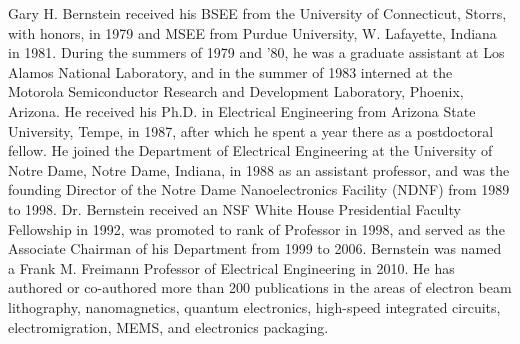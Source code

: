 \documentclass[journal]{IEEEtran}
\begin{document}
% 
\begin{IEEEbiography}
   {Gary H. Bernstein} received his BSEE from the University of Connecticut, Storrs, with honors, in 1979 and MSEE from Purdue University, W. Lafayette, Indiana in 1981. During the summers of 1979 and '80, he was a graduate assistant at Los Alamos National Laboratory, and in the summer of 1983 interned at the Motorola Semiconductor Research and Development Laboratory, Phoenix, Arizona. He received his Ph.D. in Electrical Engineering from Arizona State University, Tempe, in 1987, after which he spent a year there as a postdoctoral fellow. He joined the Department of Electrical Engineering at the University of Notre Dame, Notre Dame, Indiana, in 1988 as an assistant professor, and was the founding Director of the Notre Dame Nanoelectronics Facility (NDNF) from 1989 to 1998. Dr. Bernstein received an NSF White House Presidential Faculty Fellowship in 1992, was promoted to rank of Professor in 1998, and served as the Associate Chairman of his Department from 1999 to 2006. Bernstein was named a Frank M. Freimann Professor of Electrical Engineering in 2010. He has authored or co-authored more than 200 publications in the areas of electron beam lithography, nanomagnetics, quantum electronics, high-speed integrated circuits, electromigration, MEMS, and electronics packaging.
\end{IEEEbiography}
%
%
\end{document}
